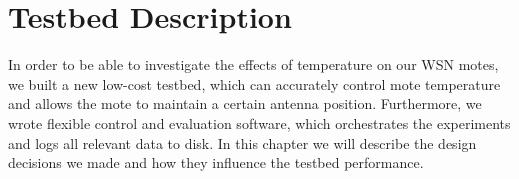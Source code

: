 \chapter{Testbed Description}
\label{chap:testbed}

In order to be able to investigate the effects of temperature on our \ac{WSN} motes, we built a new low-cost testbed, which can accurately control mote temperature and allows the mote to maintain a certain antenna position.
Furthermore, we wrote flexible control and evaluation software, which orchestrates the experiments and logs all relevant data to disk.
In this chapter we will describe the design decisions we made and how they influence the testbed performance.







